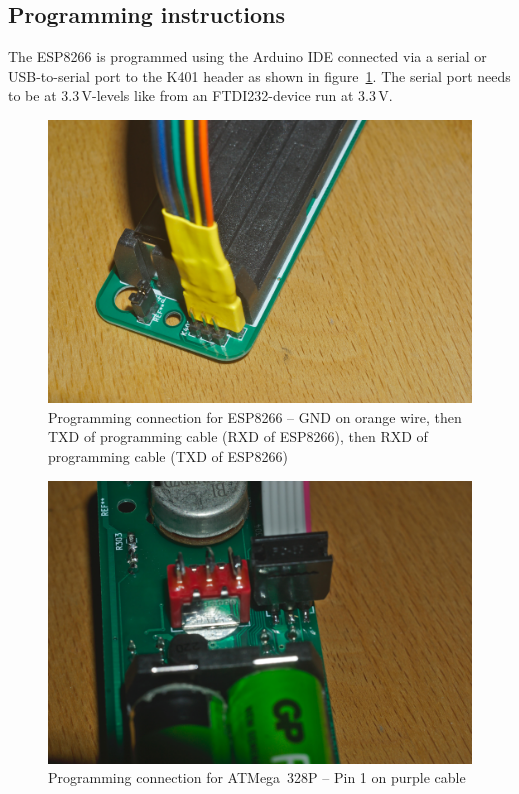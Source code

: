 \documentclass[11pt,a4paper]{scrartcl}
\begin{document}
\subsection{Programming instructions}

The ESP8266 is programmed using the Arduino IDE connected via a serial or USB-to-serial port to the K401 header as shown in figure~\ref{oldProgESP}. The serial port needs to be at 3.3\,V-levels like from an FTDI232-device run at 3.3\,V.

\begin{figure}[tbh]
  \centering
  \includegraphics[width=0.8 \textwidth]{images/_DSC8637}
  \caption{Programming connection for ESP8266 -- GND on orange wire, then TXD of programming cable (RXD of ESP8266), then RXD of programming cable (TXD of ESP8266)}
  \label{oldProgESP}
\end{figure}

\begin{figure}[tbh]
  \centering
  \includegraphics[width=0.8 \textwidth]{images/_DSC8638}
  \caption{Programming connection for ATMega~328P -- Pin 1 on purple cable}
  \label{oldProgAVR}
\end{figure}
\end{document}
